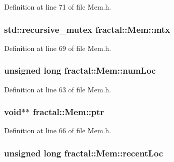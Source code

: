 Definition at line 71 of file Mem.\+h.

\hypertarget{classfractal_1_1Mem_aa30c383915eb0b8987746c11b45fa807}{
\subsubsection[{mtx}]{\setlength{\rightskip}{0pt plus 5cm}std\+::recursive\+\_\+mutex fractal\+::\+Mem\+::mtx\hspace{0.3cm}{\ttfamily [protected]}}}\label{classfractal_1_1Mem_aa30c383915eb0b8987746c11b45fa807}


Definition at line 69 of file Mem.\+h.

\hypertarget{classfractal_1_1Mem_af439baa77e71a82ed3af0c4008a2acab}{
\subsubsection[{num\+Loc}]{\setlength{\rightskip}{0pt plus 5cm}unsigned long fractal\+::\+Mem\+::num\+Loc\hspace{0.3cm}{\ttfamily [protected]}}}\label{classfractal_1_1Mem_af439baa77e71a82ed3af0c4008a2acab}


Definition at line 63 of file Mem.\+h.

\hypertarget{classfractal_1_1Mem_ae58554129a5f44942fe556518d97251e}{
\subsubsection[{ptr}]{\setlength{\rightskip}{0pt plus 5cm}void$\ast$$\ast$ fractal\+::\+Mem\+::ptr\hspace{0.3cm}{\ttfamily [protected]}}}\label{classfractal_1_1Mem_ae58554129a5f44942fe556518d97251e}


Definition at line 66 of file Mem.\+h.

\hypertarget{classfractal_1_1Mem_a88ed47770d54303686603e4c16e959bb}{
\subsubsection[{recent\+Loc}]{\setlength{\rightskip}{0pt plus 5cm}unsigned long fractal\+::\+Mem\+::recent\+Loc\hspace{0.3cm}{\ttfamily [protected]}}}\label{classfractal_1_1Mem_a88ed47770d54303686603e4c16e959bb}


